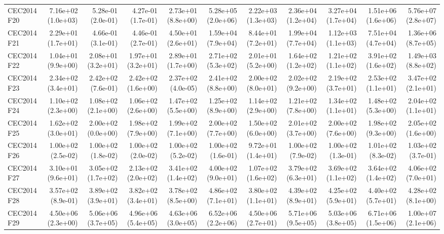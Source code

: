 \begin{longtable}{lrrrrrrrrrr}
CEC2014 F20 & 7.16e+02 (1.0e+03) & 5.28e-01 (2.0e-01) & 4.27e-01 (1.7e-01) & 2.73e+01 (8.8e+00) & 5.28e+05 (2.0e+06) & 2.22e+03 (1.3e+03) & 2.36e+04 (1.2e+04) & 3.27e+04 (1.7e+04) & 1.51e+06 (1.6e+06) & 5.76e+07 (2.8e+07) \\
CEC2014 F21 & 2.29e+01 (1.7e+01) & 4.66e-01 (3.1e-01) & 4.46e-01 (2.7e-01) & 4.50e+01 (2.6e+01) & 1.59e+04 (7.9e+04) & 8.44e+01 (7.2e+01) & 1.99e+04 (7.7e+04) & 1.12e+03 (1.1e+03) & 7.51e+04 (4.7e+04) & 1.36e+06 (8.7e+05) \\
CEC2014 F22 & 1.04e+01 (9.9e+00) & 2.08e+01 (3.2e+01) & 1.97e+01 (3.2e+01) & 2.89e+01 (1.7e+00) & 2.71e+02 (5.3e+02) & 2.01e+01 (5.2e+00) & 1.64e+02 (1.2e+02) & 1.21e+02 (1.1e+02) & 3.91e+02 (1.6e+02) & 1.49e+03 (8.8e+02) \\
CEC2014 F23 & 2.34e+02 (3.4e+01) & 2.42e+02 (7.6e-01) & 2.42e+02 (1.6e+00) & 2.37e+02 (4.0e-05) & 2.41e+02 (8.8e+00) & 2.00e+02 (8.0e+01) & 2.02e+02 (9.2e+00) & 2.19e+02 (3.7e+01) & 2.53e+02 (1.1e+01) & 3.47e+02 (2.1e+01) \\
CEC2014 F24 & 1.10e+02 (2.3e+00) & 1.08e+02 (2.1e+00) & 1.06e+02 (2.6e+00) & 1.47e+02 (5.5e+00) & 1.25e+02 (8.9e+00) & 1.14e+02 (2.9e+00) & 1.21e+02 (7.8e+00) & 1.34e+02 (1.1e+01) & 1.48e+02 (5.3e+00) & 2.04e+02 (1.1e+01) \\
CEC2014 F25 & 1.62e+02 (3.0e+01) & 2.00e+02 (0.0e+00) & 1.98e+02 (7.9e+00) & 1.99e+02 (7.1e+00) & 2.00e+02 (7.7e+00) & 1.50e+02 (6.0e+00) & 2.01e+02 (3.7e+00) & 2.00e+02 (7.6e+00) & 1.98e+02 (9.3e+00) & 2.05e+02 (1.6e+00) \\
CEC2014 F26 & 1.00e+02 (2.5e-02) & 1.00e+02 (1.8e-02) & 1.00e+02 (2.0e-02) & 1.00e+02 (5.2e-02) & 1.00e+02 (1.6e-01) & 9.72e+01 (1.4e+01) & 1.00e+02 (7.9e-02) & 1.00e+02 (1.3e-01) & 1.01e+02 (8.3e-02) & 1.03e+02 (3.7e-01) \\
CEC2014 F27 & 3.10e+01 (9.6e+01) & 3.05e+02 (1.7e+02) & 2.13e+02 (2.0e+02) & 3.41e+02 (1.4e+02) & 4.00e+02 (9.0e+01) & 1.07e+02 (1.6e+02) & 3.79e+02 (6.3e+01) & 3.69e+02 (1.1e+02) & 3.64e+02 (1.4e+02) & 4.06e+02 (7.0e+01) \\
CEC2014 F28 & 3.57e+02 (8.9e-01) & 3.89e+02 (3.9e+01) & 3.82e+02 (3.4e+01) & 3.78e+02 (8.5e+00) & 4.86e+02 (7.1e+01) & 3.80e+02 (1.1e+01) & 4.39e+02 (8.9e+01) & 4.25e+02 (5.9e+01) & 4.40e+02 (5.7e+01) & 4.28e+02 (8.1e+00) \\
CEC2014 F29 & 4.50e+06 (2.3e+00) & 5.06e+06 (3.7e+05) & 4.96e+06 (5.4e+05) & 4.63e+06 (3.0e+05) & 6.52e+06 (2.2e+06) & 4.50e+06 (2.7e+01) & 5.71e+06 (9.5e+05) & 5.03e+06 (3.8e+05) & 6.71e+06 (1.5e+06) & 1.00e+07 (2.1e+06) \\

\end{longtable}
